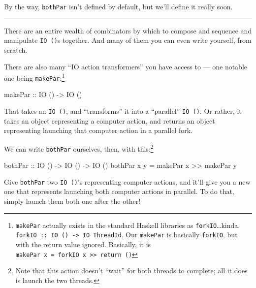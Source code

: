 \documentclass[]{article}
\newenvironment{Shaded}{}{}
\newcommand{\DataTypeTok}[1]{\textcolor[rgb]{0.56,0.13,0.00}{#1}}
\newcommand{\FunctionTok}[1]{\textcolor[rgb]{0.02,0.16,0.49}{#1}}
\newcommand{\NormalTok}[1]{#1}
\newcommand{\OtherTok}[1]{\textcolor[rgb]{0.00,0.44,0.13}{#1}}
\begin{document}
By the way, \texttt{bothPar} isn't defined by default, but we'll define it
really soon.

\begin{center}\rule{0.5\linewidth}{\linethickness}\end{center}

There are an entire wealth of combinators by which to compose and sequence and
manipulate \texttt{IO\ ()}s together. And many of them you can even write
yourself, from scratch.

There are also many ``IO action transformers'' you have access to --- one
notable one being \texttt{makePar}:\footnote{\texttt{makePar} actually exists in
  the standard Haskell libraries as \texttt{forkIO}\ldots{}kinda.
  \texttt{forkIO\ ::\ IO\ ()\ -\textgreater{}\ IO\ ThreadId}. Our
  \texttt{makePar} is basically \texttt{forkIO}, but with the return value
  ignored. Basically, it is
  \texttt{makePar\ x\ =\ forkIO\ x\ \textgreater{}\textgreater{}\ return\ ()}}

\begin{Shaded}
\begin{Highlighting}[]
\OtherTok{makePar ::} \DataTypeTok{IO}\NormalTok{ () }\OtherTok{->} \DataTypeTok{IO}\NormalTok{ ()}
\end{Highlighting}
\end{Shaded}

That takes an \texttt{IO\ ()}, and ``transforms'' it into a ``parallel''
\texttt{IO\ ()}. Or rather, it takes an object representing a computer action,
and returns an object representing launching that computer action in a parallel
fork.

We can write \texttt{bothPar} ourselves, then, with this:\footnote{Note that
  this action doesn't ``wait'' for both threads to complete; all it does is
  launch the two threads.}

\begin{Shaded}
\begin{Highlighting}[]
\OtherTok{bothPar ::} \DataTypeTok{IO}\NormalTok{ () }\OtherTok{->} \DataTypeTok{IO}\NormalTok{ () }\OtherTok{->} \DataTypeTok{IO}\NormalTok{ ()}
\NormalTok{bothPar x y }\FunctionTok{=}\NormalTok{ makePar x }\FunctionTok{>>}\NormalTok{ makePar y}
\end{Highlighting}
\end{Shaded}

Give \texttt{bothPar} two \texttt{IO\ ()}'s representing computer actions, and
it'll give you a new one that represents launching both computer actions in
parallel. To do that, simply launch them both one after the other!
\end{document}
